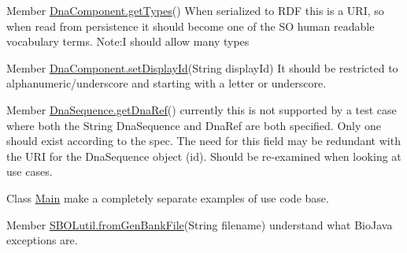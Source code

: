 \label{todo__todo000002}
\hypertarget{todo__todo000002}{}
 
\begin{DoxyDescription}
\item[Member \hyperlink{classorg_1_1sbolstandard_1_1lib_s_b_o_lj_1_1_dna_component_a518b97368db3de477d5fb57150d8b711}{DnaComponent.getTypes}() ]When serialized to RDF this is a URI, so when read from persistence it should become one of the SO human readable vocabulary terms. Note:I should allow many types 
\end{DoxyDescription}

\label{todo__todo000001}
\hypertarget{todo__todo000001}{}
 
\begin{DoxyDescription}
\item[Member \hyperlink{classorg_1_1sbolstandard_1_1lib_s_b_o_lj_1_1_dna_component_a46b93a70e7bd612a7b429aac4829bc88}{DnaComponent.setDisplayId}(String displayId) ]It should be restricted to alphanumeric/underscore and starting with a letter or underscore. 
\end{DoxyDescription}

\label{todo__todo000003}
\hypertarget{todo__todo000003}{}
 
\begin{DoxyDescription}
\item[Member \hyperlink{classorg_1_1sbolstandard_1_1lib_s_b_o_lj_1_1_dna_sequence_aa65410fe45bf6277117ef6a880e6ddce}{DnaSequence.getDnaRef}() ]currently this is not supported by a test case where both the String DnaSequence and DnaRef are both specified. Only one should exist according to the spec. The need for this field may be redundant with the URI for the DnaSequence object (id). Should be re-\/examined when looking at use cases. 
\end{DoxyDescription}

\label{todo__todo000011}
\hypertarget{todo__todo000011}{}
 
\begin{DoxyDescription}
\item[Class \hyperlink{classlib_s_b_o_lj_use_example_1_1_main}{Main} ]make a completely separate examples of use code base.
\end{DoxyDescription}

\label{todo__todo000004}
\hypertarget{todo__todo000004}{}
 
\begin{DoxyDescription}
\item[Member \hyperlink{classorg_1_1sbolstandard_1_1lib_s_b_o_lj_1_1_s_b_o_lutil_ab30e7fc9ccb218e864e45cad4366304a}{SBOLutil.fromGenBankFile}(String filename) ]understand what BioJava exceptions are. 
\end{DoxyDescription}

